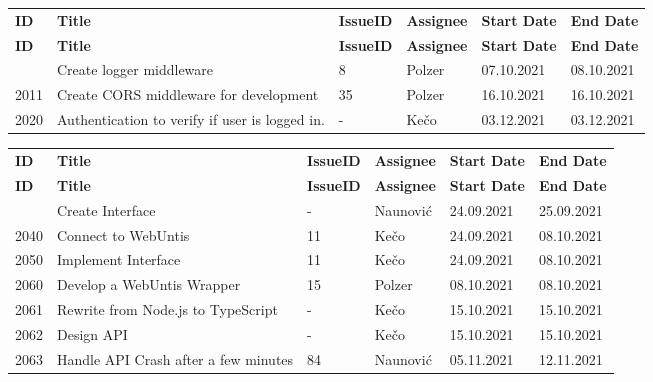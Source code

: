 
\begin{longtable}{|p{}|p{}|p{}|p{}|p{}|p{}|} \hline
    \textbf{ID} & \textbf{Title} & \textbf{Issue\-ID} & \textbf{Assignee} & \textbf{Start Date} & \textbf{End \linebreak Date} \\ \hhline{|=|=|=|=|=|=|}
    \endfirsthead
    \hline
    \textbf{ID} & \textbf{Title} & \textbf{Issue\-ID} & \textbf{Assignee} & \textbf{Start Date} & \textbf{End \linebreak Date} \\ \hhline{|=|=|=|=|=|=|}
    \endhead
    2010 & Create logger middleware & 8 & Polzer & 07.10.2021 & 08.10.2021 \\ \hline
    2011 & Create CORS middleware for development & 35  & Polzer & 16.10.2021 & 16.10.2021 \\ \hline
    2020 & Authentication to verify if user is logged in. & -  & Kečo & 03.12.2021 & 03.12.2021 \\ \hline
\end{longtable}


\begin{longtable}{|p{}|p{}|p{}|p{}|p{}|p{}|} \hline
    \textbf{ID} & \textbf{Title} & \textbf{Issue\-ID} & \textbf{Assignee} & \textbf{Start Date} & \textbf{End \linebreak Date} \\ \hhline{|=|=|=|=|=|=|}
    \endfirsthead
    \hline
    \textbf{ID} & \textbf{Title} & \textbf{Issue\-ID} & \textbf{Assignee} & \textbf{Start Date} & \textbf{End \linebreak Date} \\ \hhline{|=|=|=|=|=|=|}
    \endhead
    2030 & Create Interface & - & Naunović & 24.09.2021 & 25.09.2021 \\ \hline
    2040 & Connect to WebUntis & 11 & Kečo & 24.09.2021 & 08.10.2021 \\ \hline
    2050 & Implement Interface & 11 & Kečo & 24.09.2021 & 08.10.2021 \\ \hline
    2060 & Develop a WebUntis Wrapper & 15 & Polzer & 08.10.2021 & 08.10.2021 \\ \hline
    2061 & Rewrite from Node.js to TypeScript & - & Kečo & 15.10.2021 & 15.10.2021 \\ \hline
    2062 & Design API & - & Kečo & 15.10.2021 & 15.10.2021 \\ \hline
    2063 & Handle API Crash after a few minutes & 84 & Naunović & 05.11.2021 & 12.11.2021 \\ \hline
\end{longtable}

